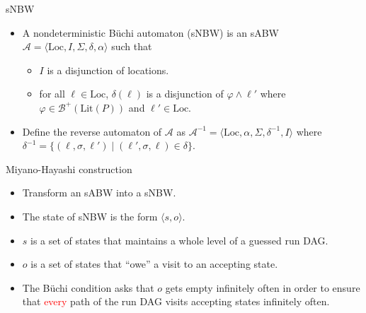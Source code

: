 \documentclass[12pt]{beamer}
\begin{document}
\begin{frame}{sNBW}
	\begin{itemize}
		\item A nondeterministic Büchi automaton (sNBW) is an sABW $\mathcal{A} = \langle \text{Loc}, I, \Sigma, \delta, \alpha \rangle$ such that
		\begin{itemize}
			\item $I$ is a disjunction of locations.
			\item for all $\ell \in \text{Loc}$, $\delta(\ell)$ is a disjunction of $\varphi \land \ell'$ where $\varphi \in \mathcal{B}^{+}(\text{Lit}(P))$ and $ \ell' \in \text{Loc}$.
		\end{itemize}
		\item Define the reverse automaton of $\mathcal{A}$ as $\mathcal{A}^{-1} = \langle \text{Loc}, \alpha, \Sigma, \delta^{-1}, I \rangle$ where $\delta^{-1} = \{(\ell, \sigma, \ell') \mid (\ell', \sigma, \ell) \in \delta\}$.
	\end{itemize}
\end{frame}

\begin{frame}{Miyano-Hayashi construction}
	\begin{itemize}
		\item Transform an sABW into a sNBW.
		\item The state of sNBW is the form $\langle s, o \rangle$.
		\item $s$ is a set of states that maintains a whole level of a guessed run DAG.
		\item $o$ is a set of states that ``owe'' a visit to an accepting state.
		\item  The Büchi condition asks that $o$ gets empty infinitely often in order to ensure that \textcolor{red}{every} path of the run DAG visits accepting states infinitely often.
	\end{itemize}
\end{frame}
\end{document}

